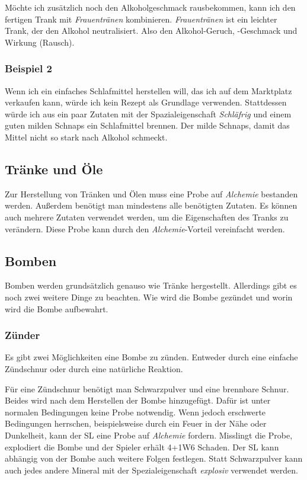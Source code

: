 Möchte ich zusätzlich noch den Alkoholgeschmack rausbekommen, kann ich den fertigen Trank mit \textit{Frauentränen} kombinieren. \textit{Frauentränen} ist ein leichter Trank, der den Alkohol neutralisiert. Also den Alkohol-Geruch, -Geschmack und Wirkung (Rausch). 

\subsubsection{Beispiel 2}
Wenn ich ein einfaches Schlafmittel herstellen will, das ich auf dem Marktplatz verkaufen kann, würde ich kein Rezept als Grundlage verwenden. Stattdessen würde ich aus ein paar Zutaten mit der Spazialeigenschaft \textit{Schläfrig} und einem guten milden Schnaps ein Schlafmittel brennen. Der milde Schnaps, damit das Mittel nicht so stark nach Alkohol schmeckt. 

\subsection{Tränke und Öle}
Zur Herstellung von Tränken und Ölen muss eine Probe auf \textit{Alchemie} bestanden werden. Außerdem benötigt man mindestens alle benötigten Zutaten. Es können auch mehrere Zutaten verwendet werden, um die Eigenschaften des Tranks zu verändern. Diese Probe kann durch den \textit{Alchemie}-Vorteil vereinfacht werden.

\subsection{Bomben}
Bomben werden grundsätzlich genauso wie Tränke hergestellt. Allerdings gibt es noch zwei weitere Dinge zu beachten. Wie wird die Bombe gezündet und worin wird die Bombe aufbewahrt.

\subsubsection{Zünder}
Es gibt zwei Möglichkeiten eine Bombe zu zünden. Entweder durch eine einfache Zündschnur oder durch eine natürliche Reaktion.

Für eine Zündschnur benötigt man Schwarzpulver und eine brennbare Schnur. Beides wird nach dem Herstellen der Bombe hinzugefügt. Dafür ist unter normalen Bedingungen keine Probe notwendig. Wenn jedoch erschwerte Bedingungen herrschen, beispielsweise durch ein Feuer in der Nähe oder Dunkelheit, kann der SL eine Probe auf \textit{Alchemie} fordern. Misslingt die Probe, explodiert die Bombe und der Spieler erhält 4+1W6 Schaden. Der SL kann abhängig von der Bombe auch weitere Folgen festlegen. Statt Schwarzpulver kann auch jedes andere Mineral mit der Spezialeigenschaft \textit{explosiv} verwendet werden.

